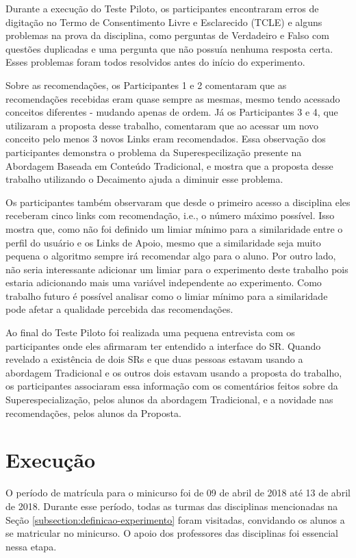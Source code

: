 Durante a execução do Teste Piloto, os participantes encontraram erros de digitação no Termo de Consentimento Livre e Esclarecido (TCLE)
e alguns problemas na prova da disciplina, como perguntas de Verdadeiro e Falso com questões duplicadas e uma
pergunta que não possuía nenhuma resposta certa. Esses problemas foram todos resolvidos antes do início do experimento.

Sobre as recomendações, os Participantes 1 e 2 comentaram que as recomendações recebidas eram quase sempre as mesmas,
mesmo tendo acessado conceitos diferentes - mudando apenas de ordem. Já os Participantes
3 e 4, que utilizaram a proposta desse trabalho, comentaram que ao acessar um novo conceito pelo menos 3 novos Links eram
recomendados. Essa observação dos participantes demonstra o problema da Superespecilização presente na Abordagem Baseada
em Conteúdo Tradicional, e mostra que a proposta desse trabalho utilizando o Decaimento ajuda a diminuir esse problema.

Os participantes também observaram que desde o primeiro acesso a disciplina eles receberam cinco links com recomendação, i.e.,
o número máximo possível. Isso mostra que, como não foi definido um limiar mínimo para a similaridade entre o perfil do usuário
e os Links de Apoio, mesmo que a similaridade seja muito pequena o algoritmo sempre irá recomendar algo para o aluno. Por
outro lado, não seria interessante adicionar um limiar para o experimento deste trabalho pois estaria adicionando
mais uma variável independente ao experimento. Como trabalho futuro é possível analisar como o limiar mínimo para a
similaridade pode afetar a qualidade percebida das recomendações.

Ao final do Teste Piloto foi realizada uma pequena entrevista com os participantes onde eles afirmaram ter entendido
a interface do SR. Quando revelado a existência de dois SRs e que duas pessoas estavam usando a abordagem
Tradicional e os outros dois estavam usando a proposta do trabalho, os participantes associaram essa informação com os
comentários feitos sobre da Superespecialização, pelos alunos da abordagem Tradicional, e a novidade nas recomendações,
pelos alunos da Proposta.

\section{Execução}\label{section:execucao-experimento}

O período de matrícula para o minicurso foi de 09 de abril de 2018 até 13 de abril de 2018. Durante esse período, todas
as turmas das disciplinas mencionadas na Seção \ref{subsection:definicao-experimento} foram visitadas, convidando os
alunos a se matricular no minicurso. O apoio dos professores das disciplinas foi essencial nessa etapa.

